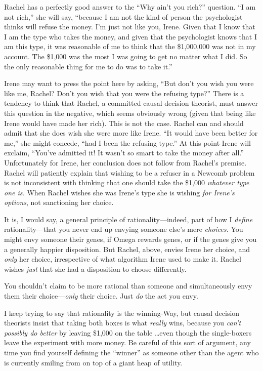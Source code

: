 {
 Rachel has a perfectly good answer to the ``Why
ain't you rich?'' question.
``I am not rich,'' she will say,
``because I am not the kind of person the psychologist
thinks will refuse the money. I'm just not like you,
Irene. Given that I know that I am the type who takes the money, and
given that the psychologist knows that I am this type, it was
reasonable of me to think that the \$1,000,000 was not in my account.
The \$1,000 was the most I was going to get no matter what I did. So
the only reasonable thing for me to do was to take
it.''}

{
 Irene may want to press the point here by asking,
``But don't you wish you were like me,
Rachel? Don't you wish that you were the refusing
type?'' There is a tendency to think that Rachel, a
committed causal decision theorist, must answer this question in the
negative, which seems obviously wrong (given that being like Irene
would have made her rich). This is not the case. Rachel can and should
admit that she does wish she were more like Irene.
``It would have been better for
me,'' she might concede, ``had I
been the refusing type.'' At this point Irene will
exclaim, ``You've admitted it! It
wasn't so smart to take the money after
all.'' Unfortunately for Irene, her conclusion does
not follow from Rachel's premise. Rachel will patiently
explain that wishing to be a refuser in a Newcomb problem is not
inconsistent with thinking that one should take the \$1,000
\textit{whatever type one is.} When Rachel wishes she was
Irene's type she is wishing \textit{for
Irene's options}, not sanctioning her choice.}

{
 It is, I would say, a general principle of rationality---indeed,
part of how I \textit{define} rationality---that you never end up
envying someone else's mere \textit{choices.} You might
envy someone their genes, if Omega rewards genes, or if the genes give
you a generally happier disposition. But Rachel, above, envies Irene
her choice, and \textit{only} her choice, irrespective of what
algorithm Irene used to make it. Rachel wishes \textit{just} that she
had a disposition to choose differently.}

{
 You shouldn't claim to be more rational than
someone and simultaneously envy them their choice---\textit{only} their
choice. Just \textit{do} the act you envy.}

{
 I keep trying to say that rationality is the winning-Way, but
causal decision theorists insist that taking both boxes is what
\textit{really} wins, because you \textit{can't
possibly do better} by leaving \$1,000 on the table \ldots even though
the single-boxers leave the experiment with more money. Be careful of
this sort of argument, any time you find yourself defining the
``winner'' as someone other than the
agent who is currently smiling from on top of a giant heap of utility.}

